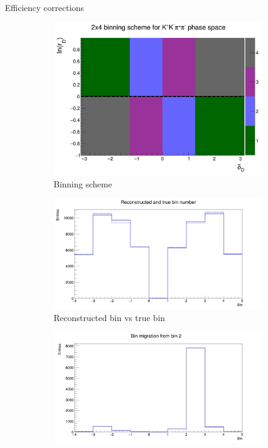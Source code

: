 \documentclass{beamer}
\begin{document}
\begin{frame}{Efficiency corrections}
  \begin{figure}
    \centering
    \begin{subfigure}{0.38\textwidth}
      \centering
      \includegraphics[width=\textwidth]{Plots/BinningSchemePlot_4Bins.png}
      \caption{Binning scheme}
    \end{subfigure}
    \begin{subfigure}{0.38\textwidth}
      \centering
      \includegraphics[width=\textwidth]{Plots/ReconstructedTrueBins.png}
      \caption{Reconstructed bin vs true bin}
    \end{subfigure}%
    \begin{subfigure}{0.38\textwidth}
      \centering
      \includegraphics[width=\textwidth]{Plots/BinMigrationBin2.png}

\end{subfigure}
\end{figure}
\end{frame}
\end{document}
